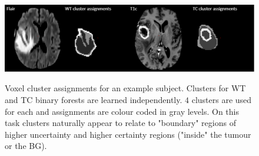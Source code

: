 \begin{figure}
\centering
\includegraphics[width=1\columnwidth]{images/clusters-illustration.png}
\label{fig: clusters}
\caption{Voxel cluster assignments for an example subject. Clusters for WT and TC binary forests are learned independently. $4$ clusters are used for each and assignments are colour coded in gray levels. On this task clusters naturally appear to relate to "boundary" regions of higher uncertainty and higher certainty regions ("inside" the tumour or the BG).}
\end{figure}

